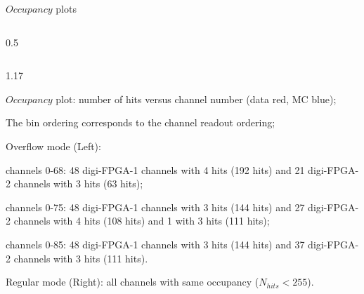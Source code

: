\documentclass{beamer}
\begin{document}
\begin{frame}{$Occupancy$ plots}
\begin{columns}
\begin{column}{0.5 \framewidth}
\begin{figure}[H]
          \label{fig:dfjkdsfh} 
\end{figure} 
    \end{column}
\end{columns}      
\vspace{-3.6mm}
 \begin{columns}
    \begin{column}{1.17\framewidth}
     \begin{itemize}
     {\small
      \item $Occupancy$ plot: number of hits versus channel number (data red, MC blue);
      \item The bin ordering corresponds to the channel readout ordering;
    \item Overflow mode (Left):  }
    \begin{itemize}
    {\small
        \item channels 0-68: 48 digi-FPGA-1 channels with 4 hits (192 hits) and 21 digi-FPGA-2 channels with 3 hits (63 hits);
        \item channels 0-75: 48 digi-FPGA-1 channels with 3 hits (144 hits) and 27 digi-FPGA-2 channels with 4 hits (108 hits) and 1 with 3 hits (111 hits);
        \item channels 0-85: 48 digi-FPGA-1 channels with 3 hits (144 hits) and 37 digi-FPGA-2 channels with 3 hits (111 hits).}
    \end{itemize}
    \item  {\small Regular mode (Right): all channels with same occupancy ($N_{hits}<255$).
    }
   
        \end{itemize}
             \end{column}
\end{columns}     
\end{frame}
\end{document}

